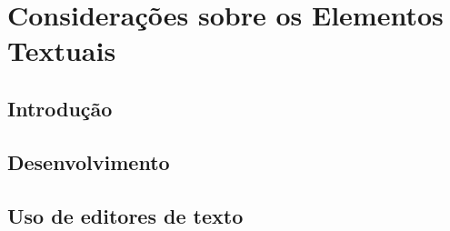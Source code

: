\chapter[Considerações sobre os Elementos Textuais]{Considerações sobre os
Elementos Textuais}

\section{Introdução}

\section{Desenvolvimento}


\section{Uso de editores de texto}